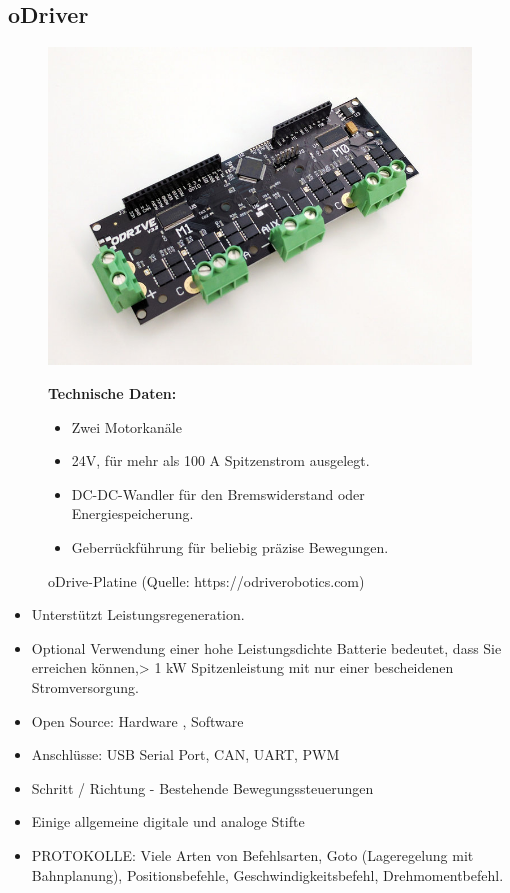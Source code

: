 \subsection{oDriver}
\begin{figure}[htb]
	\centering
	\begin{minipage}{0.38\linewidth}
		\centering
		\includegraphics[scale=0.2]{images/odrive.jpeg}
		\caption{oDrive-Platine  \newline (Quelle: https://odriverobotics.com)}
		\label{odrive}
	\end{minipage}
 \begin{minipage}[h]{0.6\textwidth}
	\textbf{Technische Daten:} 
	\begin{itemize} 
		\item Zwei Motorkanäle
		\item 24V, für mehr als 100 A Spitzenstrom ausgelegt.
		\item DC-DC-Wandler für den Bremswiderstand oder Energiespeicherung.
		\item Geberrückführung für beliebig präzise Bewegungen.
	\end{itemize}
\end{minipage}
\end{figure}
\begin{itemize} 
\item Unterstützt Leistungsregeneration.
\item Optional Verwendung einer hohe Leistungsdichte Batterie bedeutet, dass Sie erreichen können,> 1 kW Spitzenleistung mit nur einer bescheidenen Stromversorgung.
\item Open Source: Hardware , Software
\item Anschlüsse: USB Serial Port, CAN, UART, PWM
\item Schritt / Richtung - Bestehende Bewegungssteuerungen
\item Einige allgemeine digitale und analoge Stifte
\item PROTOKOLLE: Viele Arten von Befehlsarten, 
Goto (Lageregelung mit Bahnplanung), 
Positionsbefehle, 
Geschwindigkeitsbefehl, 
Drehmomentbefehl.
\end{itemize}
